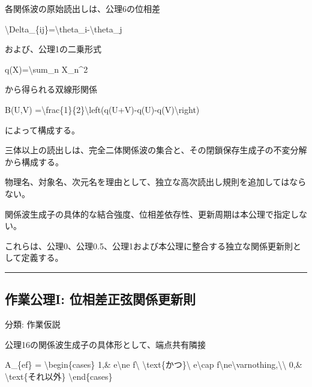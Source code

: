 \documentclass[
  a4paper,
]{ltjsarticle}
\newenvironment{Shaded}{}{}
\newcommand{\NormalTok}[1]{#1}
\begin{document}
各関係波の原始読出しは、公理6の位相差

\begin{Shaded}
\begin{Highlighting}[]
\NormalTok{\textbackslash{}Delta\_\{ij\}=\textbackslash{}theta\_i{-}\textbackslash{}theta\_j}
\end{Highlighting}
\end{Shaded}

および、公理1の二乗形式

\begin{Shaded}
\begin{Highlighting}[]
\NormalTok{q(X)=\textbackslash{}sum\_n X\_n\^{}2}
\end{Highlighting}
\end{Shaded}

から得られる双線形関係

\begin{Shaded}
\begin{Highlighting}[]
\NormalTok{B(U,V)}
\NormalTok{=\textbackslash{}frac\{1\}\{2\}\textbackslash{}left(q(U+V){-}q(U){-}q(V)\textbackslash{}right)}
\end{Highlighting}
\end{Shaded}

によって構成する。

三体以上の読出しは、完全二体関係波の集合と、その閉鎖保存生成子の不変分解から構成する。

物理名、対象名、次元名を理由として、独立な高次読出し規則を追加してはならない。

関係波生成子の具体的な結合強度、位相差依存性、更新周期は本公理で指定しない。

これらは、公理0、公理0.5、公理1および本公理に整合する独立な関係更新則として定義する。

\begin{center}\rule{0.5\linewidth}{0.5pt}\end{center}

\subsection{作業公理I:
位相差正弦関係更新則}\label{ux4f5cux696dux516cux7406i-ux4f4dux76f8ux5deeux6b63ux5f26ux95a2ux4fc2ux66f4ux65b0ux5247}

分類: 作業仮説

公理16の関係波生成子の具体形として、端点共有隣接

\begin{Shaded}
\begin{Highlighting}[]
\NormalTok{A\_\{ef\}}
\NormalTok{=}
\NormalTok{\textbackslash{}begin\{cases\}}
\NormalTok{1,\& e\textbackslash{}ne f\textbackslash{} \textbackslash{}text\{かつ\}\textbackslash{} e\textbackslash{}cap f\textbackslash{}ne\textbackslash{}varnothing,\textbackslash{}\textbackslash{}}
\NormalTok{0,\& \textbackslash{}text\{それ以外\}}
\NormalTok{\textbackslash{}end\{cases\}}
\end{Highlighting}
\end{Shaded}
\end{document}
